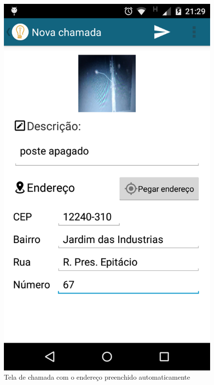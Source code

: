 \documentclass[
	article,			%
	11pt,				%
	oneside,			%
	a4paper,			%
	english,			%
	brazil,				%
	sumario=tradicional
	]{abntex2}
\begin{document}
\begin{figure}[!htbp]
 \centering
  \begin{minipage}{0.4\textwidth}
    \centering
    \caption{\label{android-tela-nova-chamada-endereco}Tela de chamada com o endereço preenchido automaticamente}
    \includegraphics[scale=0.1]{android/5.png}
  \end{minipage}
  \hfill
  \begin{minipage}{0.4\textwidth}

\end{minipage}
\end{figure}
\end{document}
